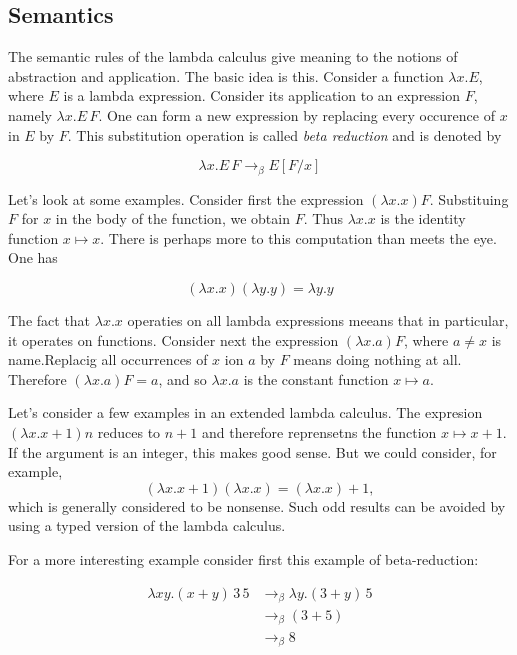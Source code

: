 \subsection{Semantics}

The semantic rules of the lambda calculus give meaning to the notions of abstraction and application.  The basic idea is this.  Consider a function $\lambda x.E$, where $E$ is a lambda expression.  Consider its application to an expression $F$, namely $\lambda x. E\, F$.  One can form a new expression by replacing every occurence of $x$ in $E$ by $F$.  This substitution operation is called \emph{beta reduction} and is denoted by 

\begin{equation}
  \lambda x. E\, F \to_\beta E[F/x]
\end{equation}

Let's look at some examples. Consider first the expression $(\lambda x.x)F$.  Substituing $F$ for $x$ in the body of the function, we obtain  $F$.  Thus $\lambda x.x$ is the identity function $x \mapsto x$.  There is perhaps more to this computation than meets the eye.  One has

\begin{equation}
  (\lambda x.x)(\lambda y. y) = \lambda y. y
\end{equation}

The fact that $\lambda x.x$ operaties on all lambda expressions meeans that in particular, it operates on functions.  Consider next the expression $(\lambda x.a) F$, where $a \ne x$ is name.Replacig all occurrences of $x$ ion $a$ by $F$  means doing nothing at all.  Therefore $(\lambda x.a)F = a$, and so $\lambda x.a$ is the constant function $x \mapsto a$.

Let's consider a few examples in an extended lambda calculus.  The expresion $(\lambda x.x+1)n$ reduces to $n+1$ and therefore reprensetns the function $x \mapsto x + 1$.  If the argument is an integer, this makes good sense.  But we could consider, for example, 
$$
  (\lambda x.x + 1)(\lambda x.x) = (\lambda x.x) + 1,
$$ 
which is generally considered to be nonsense.  Such odd results can be avoided by using a typed version of the lambda calculus.

For a more interesting example consider first this example of beta-reduction:

\begin{align}
  \lambda x y.(x + y)\, 3\, 5 &\to_\beta \lambda y.(3 + y)\, 5 \\
      &\to_\beta (3 + 5) \\
    &\to_\beta 8 \\
\end{align}

